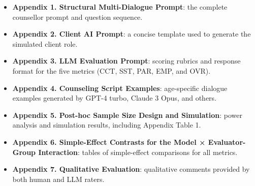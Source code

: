 \documentclass{wiley-article}
\begin{document}
\begin{itemize}
  \item \textbf{Appendix 1. Structural Multi-Dialogue Prompt}: the complete counsellor prompt and question sequence.
  \item \textbf{Appendix 2. Client AI Prompt}: a concise template used to generate the simulated client role.
  \item \textbf{Appendix 3. LLM Evaluation Prompt}: scoring rubrics and response format for the five metrics (CCT, SST, PAR, EMP, and OVR).
  \item \textbf{Appendix 4. Counseling Script Examples}: age-specific dialogue examples generated by GPT-4 turbo, Claude 3 Opus, and others.
  \item \textbf{Appendix 5. Post-hoc Sample Size Design and Simulation}: power analysis and simulation results, including Appendix Table 1.
  \item \textbf{Appendix 6. Simple-Effect Contrasts for the Model × Evaluator-Group Interaction}: tables of simple-effect comparisons for all metrics.
  \item \textbf{Appendix 7. Qualitative Evaluation}: qualitative comments provided by both human and LLM raters.
\end{itemize}

\printendnotes



% 
% 



\clearpage                
% 





% 
\end{document}
